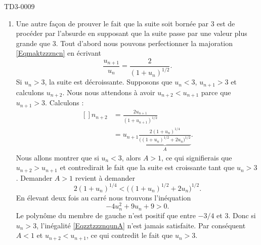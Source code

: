 \begin{corrige}{TD3-0009}
\begin{enumerate}
\begin{enumerate}
                \item
                    Une autre façon de prouver le fait que la suite soit bornée par \( 3\) est de procéder par l'absurde en supposant que la suite passe par une valeur plus grande que \( 3\). Tout d'abord nous pouvons perfectionner la majoration \eqref{Eqmaktzzzncn} en écrivant 
                    \begin{equation}
                        \frac{ u_{n+1} }{ u_n }=\frac{ 2 }{ (1+u_n)^{1/2} }.
                    \end{equation}
                    Si \( u_n>3\), la suite est décroissante. Supposons que \( u_{n}<3\), \( u_{n+1}>3\) et calculons \( u_{n+2}\). Nous nous attendons à avoir \( u_{n+2}<u_{n+1}\) parce que \( u_{n+1}>3\). Calculons :
                    \begin{equation}
                        \begin{aligned}[]
                            n_{n+2}&=\frac{ 2u_{n+1} }{ (1+u_{n+1})^{1/2} }\\
                            &=u_{n+1}\underbrace{\frac{ 2(1+u_n)^{1/4} }{ \big( (1+u_n)^{1/2}+2u_n \big)^{1/2} }}_{A}.
                        \end{aligned}
                    \end{equation}
                    Nous allons montrer que si \( u_n<3\), alors \( A>1\), ce qui signifierais que \( u_{n+2}>u_{n+1}\) et contredirait le fait que la suite est croissante tant que \( u_n>3\). Demander \( A>1\) revient à demander
                    \begin{equation}
                        2(1+u_n)^{1/4}<\big( (1+u_n)^{1/2}+2u_n \big)^{1/2}.
                    \end{equation}
                    En élevant deux fois au carré nous trouvons l'inéquation
                    \begin{equation}        \label{EqzztzzznqunA}
                        -4u_n^2+9u_n+9>0.
                    \end{equation}
                    Le polynôme du membre de gauche n'est positif que entre \( -3/4\) et \( 3\). Donc si \( u_n>3\), l'inégalité \eqref{EqzztzzznqunA} n'est jamais satisfaite. Par conséquent \( A<1\) et \( u_{n+2}<u_{n+1}\), ce qui contredit le fait que \( u_n>3\).

                        
                \end{enumerate}
            
	\end{enumerate}
	
\end{corrige}
